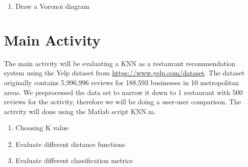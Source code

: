 \documentclass{report}
\begin{document}
\begin{enumerate}
\item Draw a Voronoi diagram
\end{enumerate}

\section*{Main Activity}

The main activity will be evaluating a KNN as a restaurant recommendation system using the Yelp dataset from \href{https://www.yelp.com/dataset}{https://www.yelp.com/dataset}.
The dataset originally contains 5,996,996 reviews for 188,593 businesses in 10 metropolitan areas.
We preprocessed the data set to narrow it down to 1 restaurant with 500 reviews for the activity, therefore we will be doing a user-user comparison.  
The activity will done using the Matlab script KNN.m.

\begin{enumerate}

\item Choosing K value

\item Evaluate different distance functions

\item Evaluate different classification metrics

\end{enumerate}

\end{document}
